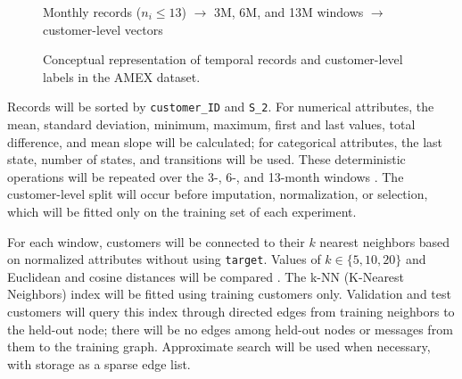 \documentclass[conference]{IEEEtran}
\begin{document}
\begin{figure}[htbp]
    \centering
    \scriptsize
    \renewcommand{\arraystretch}{1.1}
    \vspace{0.5mm}

    Monthly records ($n_i \leq 13$) $\rightarrow$ 3M, 6M, and 13M windows $\rightarrow$ customer-level vectors
    \vspace{-1mm}
    \caption{Conceptual representation of temporal records and customer-level labels in the AMEX dataset.}
    \label{fig:amex-sample}
\end{figure}

Records will be sorted by \texttt{customer\_ID} and \texttt{S\_2}. For numerical attributes, the mean, standard deviation, minimum, maximum, first and last values, total difference, and mean slope will be calculated; for categorical attributes, the last state, number of states, and transitions will be used. These deterministic operations will be repeated over the 3-, 6-, and 13-month windows \cite{shukla2024featureengineering,li2026temporalfeatureengineering,zheng2018feature}. The customer-level split will occur before imputation, normalization, or selection, which will be fitted only on the training set of each experiment.

For each window, customers will be connected to their $k$ nearest neighbors based on normalized attributes without using \texttt{target}. Values of $k\in\{5,10,20\}$ and Euclidean and cosine distances will be compared \cite{SUN2025763}. The k-NN (K-Nearest Neighbors) index will be fitted using training customers only. Validation and test customers will query this index through directed edges from training neighbors to the held-out node; there will be no edges among held-out nodes or messages from them to the training graph. Approximate search will be used when necessary, with storage as a sparse edge list.
\end{document}
